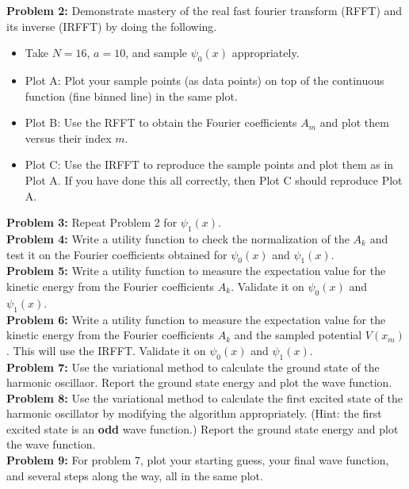 \documentclass[12pt]{article}
\begin{document}
\noindent
{\bf Problem 2:} Demonstrate mastery of the real fast fourier
transform (RFFT) and its inverse (IRFFT) by doing the following.
\begin{itemize}
 \item Take $N=16$, $a=10$, and sample $\psi_0(x)$ appropriately. 
 \item Plot A: Plot your sample points (as data points) on top of the
   continuous function (fine binned line) in the same plot.
 \item Plot B:  Use the RFFT to obtain the Fourier coefficients $A_m$ and plot them versus their index $m$.
 \item Plot C:  Use the IRFFT to reproduce the sample points and plot them as in Plot A. If you have done this all correctly, then Plot C should reproduce Plot A. \\[3pt]
\end{itemize}

\noindent
{\bf Problem 3:} Repeat Problem 2 for $\psi_1(x)$.\\[3pt]

\noindent
{\bf Problem 4:} Write a utility function to check the normalization of the $A_k$ and test it on the Fourier coefficients obtained for $\psi_0(x)$ and $\psi_1(x)$.\\[3pt]

\noindent
{\bf Problem 5:} Write a utility function to measure the expectation value for the kinetic energy from the Fourier coefficients $A_k$.   Validate it on $\psi_0(x)$ and $\psi_1(x)$.\\[3pt]

\noindent
{\bf Problem 6:} Write a utility function to measure the expectation
value for the kinetic energy from the Fourier coefficients $A_k$ and
the sampled potential $V(x_m)$.  This will use the IRFFT.  Validate it
on $\psi_0(x)$ and $\psi_1(x)$.\\[3pt]

\noindent
{\bf Problem 7:} Use the variational method to calculate the ground state of the harmonic oscillaor.  Report the ground state energy and plot the wave function.\\[3pt]

\noindent
{\bf Problem 8:} Use the variational method to calculate the first
excited state of the harmonic oscillator by modifying the algorithm
appropriately.  (Hint: the first excited state is an {\bf odd} wave
function.)  Report the ground state energy and plot the wave
function.\\[3pt]

\noindent
{\bf Problem 9:} For problem 7, plot your starting guess, your final wave function, and several steps along the way, all in the same plot.\\[3pt]
\end{document}
